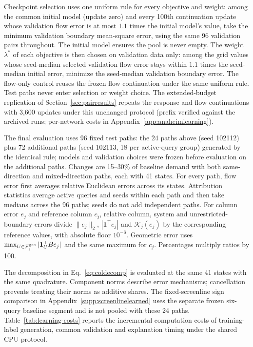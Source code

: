 Checkpoint selection uses one uniform rule for every objective and
weight: among the common initial model (update zero) and every 100th
continuation update whose validation flow error is at most $1.1$ times
the initial model's value, take the minimum validation boundary
mean-square error, using the same 96 validation pairs throughout. The
initial model ensures the pool is never empty. The weight $\lambda^*$ of
each objective is then chosen on validation data only: among the grid
values whose seed-median selected validation flow error stays within
$1.1$ times the seed-median initial error, minimize the seed-median
validation boundary error. The flow-only control reuses the frozen
flow continuation under the same uniform rule. Test paths never enter
selection or weight choice. The extended-budget replication of
Section~\ref{sec:pairresults} repeats the response and flow
continuations with 3{,}600 updates under this unchanged protocol
(prefix verified against the archived runs; per-network costs in
Appendix~\ref{app:anaheimlearning}).

The final evaluation uses 96 fixed test paths: the 24 paths above
(seed 102112) plus 72 additional paths (seed 102113, 18 per active-query
group) generated by the identical rule; models and validation choices
were frozen before evaluation on the additional paths. Changes
are 15--30\% of baseline demand with both same-direction and mixed-direction
paths, each with 41 states. For every path, flow error first averages relative
Euclidean errors across its states. Attribution statistics average active
queries and seeds within each path and then take medians across the 96 paths;
seeds do not add independent paths. For column error $e_j$ and reference column
$c_j$, relative column, system and unrestricted-boundary errors divide
$\|e_j\|_2$, $|\mathbf1^\top e_j|$ and $\mathcal K_j(e_j)$ by the
corresponding reference values, with absolute floor $10^{-6}$. Geometric error
uses $\max_{U\in\mathcal F_j^{\rm geo}}|\mathbf1_U^\top Be_j|$ and
the same maximum for $c_j$. Percentages multiply ratios by 100.

The decomposition in Eq.~\eqref{eq:coldecomp} is evaluated at the same 41 states
with the same quadrature. Component norms describe error mechanisms; cancellation
prevents treating their norms as additive shares. The fixed-screenline sign
comparison in Appendix~\ref{supp:screenlinelearned} uses the separate frozen
six-query baseline segment and is not pooled with these 24 paths.
Table~\ref{tab:learning-costs} reports the incremental computation
costs of training-label generation, common validation and explanation
timing under the shared CPU protocol.

